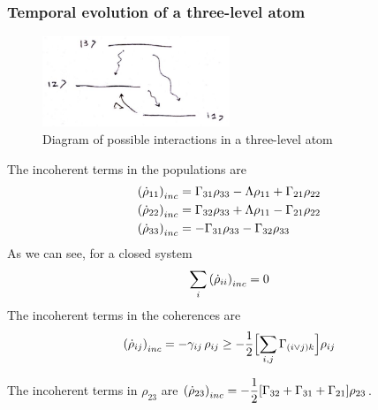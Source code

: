 \subsubsection*{Temporal evolution of a three-level atom}
\begin{figure}[H]
	\centering
	\includegraphics[width=0.5\textwidth]{./images/3-three-level-decay}
	\caption{Diagram of possible interactions in a three-level atom}
	\label{fig:three-level-decay}
\end{figure}

The incoherent terms in the populations are
\begin{align*}
	\qty(\dot{\rho}_{11})_{inc} &= \Gamma_{31} \rho_{33} - \Lambda \rho_{11} + \Gamma_{21} \rho_{22} \\
	\qty(\dot{\rho}_{22})_{inc} &= \Gamma_{32} \rho_{33} + \Lambda \rho_{11} - \Gamma_{21} \rho_{22} \\
	\qty(\dot{\rho}_{33})_{inc} &= - \Gamma_{31} \rho_{33} - \Gamma_{32} \rho_{33}
\end{align*}
As we can see, for a closed system
\begin{align}
	\sum_{i} \qty( \dot{\rho}_{ii} )_{inc} = 0
\end{align}
The incoherent terms in the coherences are
\begin{align*}
	\qty(\dot{\rho}_{ij})_{inc} = - \gamma_{ij} \, \rho_{ij} \geq - \frac{1}{2} \qty\Big[\sum_{i,j} \Gamma_{(i \vee j) k} ] \rho_{ij}
\end{align*}
\begin{example}
	The incoherent terms in $\rho_{23}$ are $\qty(\dot{\rho}_{23})_{inc} = - \dfrac{1}{2} \qty[\Gamma_{32} + \Gamma_{31} + \Gamma_{21}] \rho_{23}$.
\end{example}

